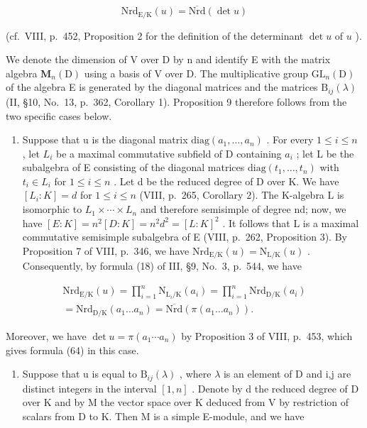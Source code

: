 \[
\mathrm{Nrd} _ {\mathrm{E/K}} (u) = \overline {{\mathrm{Nrd}}} (\det u)\tag{64}
\]

(cf.~VIII, p.~452, Proposition 2 for the definition of the determinant \(\det u\) of \(u\) ).

We denote the dimension of V over D by n and identify E with the matrix algebra \(\mathbf{M}_{n}(\mathrm{D})\) using a basis of V over D. The multiplicative group \(\mathrm{GL}_{n}(\mathrm{D})\) of the algebra E is generated by the diagonal matrices and the matrices \(\mathrm{B}_{ij}(\lambda)\) (II, §10, No.~13, p.~362, Corollary 1). Proposition 9 therefore follows from the two specific cases below.

\begin{enumerate}
\def\labelenumi{\Alph{enumi})}
\tightlist
\item
  Suppose that u is the diagonal matrix \(\mathrm{diag}(a_{1},\ldots,a_{n})\) . For every \(1\leqslant i\leqslant n\) , let \(L_{i}\) be a maximal commutative subfield of D containing \(a_{i}\) ; let L be the subalgebra of E consisting of the diagonal matrices \(\mathrm{diag}(t_{1},\ldots,t_{n})\) with \(t_{i}\in L_{i}\) for \(1\leqslant i\leqslant n\) . Let d be the reduced degree of D over K. We have \([L_{i}:K]=d\) for \(1\leqslant i\leqslant n\) (VIII, p.~265, Corollary 2). The K-algebra L is isomorphic to \(L_{1}\times\cdots\times L_{n}\) and therefore semisimple of degree nd; now, we have \([E:K]=n^{2}[D:K]=n^{2}d^{2}=[L:K]^{2}\) . It follows that L is a maximal commutative semisimple subalgebra of E (VIII, p.~262, Proposition 3). By Proposition 7 of VIII, p.~346, we have \(\mathrm{Nrd}_{\mathrm{E}/\mathrm{K}}(u)=\mathrm{N}_{\mathrm{L}/\mathrm{K}}(u)\) . Consequently, by formula (18) of III, §9, No.~3, p.~544, we have
\end{enumerate}

\[
\begin{array}{c} \mathrm{Nrd} _ {\mathrm{E/K}} (u) = \prod_ {i = 1} ^ {n} \mathrm{N} _ {\mathrm{L} _ {i} / \mathrm{K}} (a _ {i}) = \prod_ {i = 1} ^ {n} \mathrm{Nrd} _ {\mathrm{D/K}} (a _ {i}) \\ = \mathrm{Nrd} _ {\mathrm{D/K}} (a _ {1} \dots a _ {n}) = \overline {{\mathrm{Nrd}}} (\pi (a _ {1} \dots a _ {n}))  . \end{array}
\]

Moreover, we have \(\det u = \pi(a_{1} \cdots a_{n})\) by Proposition 3 of VIII, p.~453, which gives formula (64) in this case.

\begin{enumerate}
\def\labelenumi{\Alph{enumi})}
\setcounter{enumi}{1}
\tightlist
\item
  Suppose that u is equal to \(\mathrm{B}_{ij}(\lambda)\) , where \(\lambda\) is an element of D and i,j are distinct integers in the interval \([1,n]\) . Denote by d the reduced degree of D over K and by M the vector space over K deduced from V by restriction of scalars from D to K. Then M is a simple E-module, and we have
\end{enumerate}


